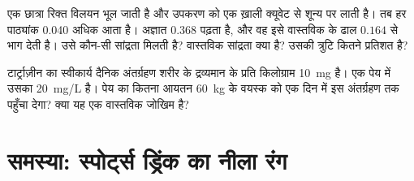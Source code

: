 \begin{exercise}[$\star\star\star$]\label{exo:g11:absorbance:14}
एक छात्रा रिक्त विलयन भूल जाती है और उपकरण को एक ख़ाली क्यूवेट से शून्य पर लाती
है। तब हर पाठ्यांक \num{0.040} अधिक आता है। अज्ञात
$0.368$ पढ़ता है, और वह इसे वास्तविक  के ढाल $0.164$ से भाग देती
है। उसे कौन-सी सांद्रता मिलती है? वास्तविक सांद्रता क्या है? उसकी त्रुटि कितने
प्रतिशत है?
\end{exercise}

\begin{exercise}[$\star\star\star$]\label{exo:g11:absorbance:15}
टार्ट्राज़ीन का स्वीकार्य दैनिक अंतर्ग्रहण शरीर के द्रव्यमान के प्रति किलोग्राम
\qty{10}{mg} है। एक पेय में उसका \qty{20}{mg/L} है। पेय का कितना आयतन
\qty{60}{kg} के वयस्क को एक दिन में इस अंतर्ग्रहण तक पहुँचा देगा? क्या
यह एक वास्तविक जोखिम है?
\end{exercise}

\section{समस्या: स्पोर्ट्स ड्रिंक का नीला रंग}


